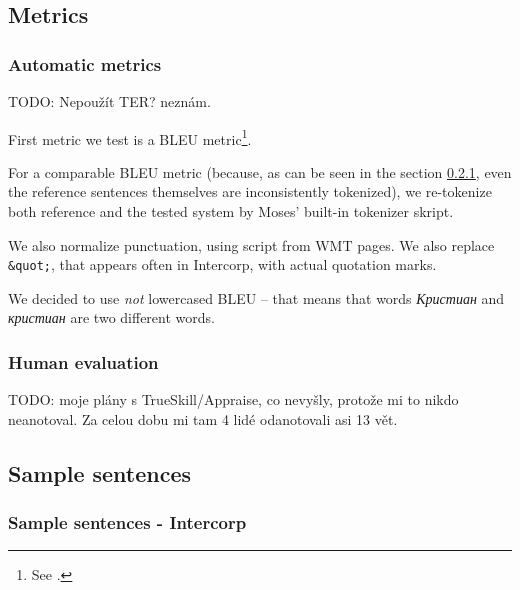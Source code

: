 

\subsection{Metrics}
\subsubsection{Automatic metrics}
TODO: Nepoužít TER? neznám.

First metric we test is a BLEU metric\footnote{See \cite{bleu}.}.

For a comparable BLEU metric (because, as can be seen in the section \ref{samples}, even the reference sentences themselves are inconsistently tokenized), we re-tokenize both reference and the tested system by Moses' built-in tokenizer skript.

We also normalize punctuation, using script from WMT pages. We also replace \texttt{\&quot;}, that appears often in Intercorp, with actual quotation marks.

We decided to use \emph{not} lowercased BLEU -- that means that words \emph{Кристиан} and \emph{кристиан} are two different words.

\subsubsection{Human evaluation}
TODO: moje plány s TrueSkill/Appraise, co nevyšly, protože mi to nikdo neanotoval. Za celou dobu mi tam 4 lidé odanotovali asi 13 vět.

\subsection{Sample sentences}

\subsubsection{Sample sentences - Intercorp}
\label{samples}


